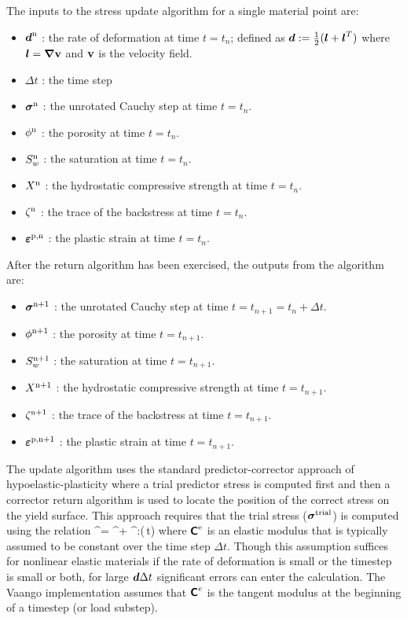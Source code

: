 The inputs to the stress update algorithm for a single material point are:
\begin{itemize}
  \item $\boldsymbol{d}^{\text{n}}$ : {\Ochre the rate of deformation at time $t = t_n$; 
        defined as $\boldsymbol{d} := \tfrac{1}{2}(\boldsymbol{l} + \boldsymbol{l}^T)$ where 
        $\boldsymbol{l} = \boldsymbol{\nabla} \mathbf{v}$ and $\mathbf{v}$ is the velocity field.}
  \item $\Delta t$ : {\Ochre the time step}
  \item $\boldsymbol{\sigma}^{\text{n}}$ : {\Ochre the unrotated Cauchy step at time $t = t_n$.}
  \item $\phi^{\text{n}}$ : {\Ochre the porosity at time $t = t_n$.}
  \item $S_w^{\text{n}}$ : {\Ochre the saturation at time $t = t_n$.}
  \item $X^{\text{n}}$ : {\Ochre the hydrostatic compressive strength at time $t = t_n$.}
  \item $\zeta^{\text{n}}$ : {\Ochre the trace of the backstress at time $t = t_n$.}
  \item $\boldsymbol{\varepsilon}^{\text{p},\text{n}}$ : {\Ochre the plastic strain at time $t = t_n$.}
\end{itemize}
After the return algorithm has been exercised, the outputs from the algorithm are:
\begin{itemize}
  \item $\boldsymbol{\sigma}^{\text{n}+1}$ : {\Ochre the unrotated Cauchy step at time $t = t_{n+1} = t_n + \Delta t$.}
  \item $\phi^{\text{n}+1}$ : {\Ochre the porosity at time $t = t_{n+1}$.}
  \item $S_w^{\text{n}+1}$ : {\Ochre the saturation at time $t = t_{n+1}$.}
  \item $X^{\text{n}+1}$ : {\Ochre the hydrostatic compressive strength at time $t = t_{n+1}$.}
  \item $\zeta^{\text{n}+1}$ : {\Ochre the trace of the backstress at time $t = t_{n+1}$.}
  \item $\boldsymbol{\varepsilon}^{\text{p},\text{n}+1}$ : {\Ochre the plastic strain at time $t = t_{n+1}$.}
\end{itemize}

The update algorithm uses the standard predictor-corrector approach of hypoelastic-plasticity
where a trial predictor stress is computed first and then a corrector return algorithm is used to
locate the position of the correct stress on the yield surface. This approach requires that
the trial stress ($\boldsymbol{\sigma}^{\text{trial}}$) is computed using the relation
\Beq
  \Bsig^\Trial = \Bsig^\Tn + \SfC^\Te:(\Bd\,\Delta t)
\Eeq
where $\boldsymbol{\mathsf{C}}^{\text{e}}$ is an elastic modulus that is typically assumed to be constant over the time 
step $\Delta t$.  Though this assumption suffices for nonlinear elastic materials if the rate of 
deformation is small or the timestep is small or both, for large $\boldsymbol{d} \Delta t$ significant errors
can enter the calculation.  {\Ochre The Vaango implementation assumes that $\boldsymbol{\mathsf{C}}^e$ is the tangent 
modulus at the beginning of a timestep (or load substep).}

